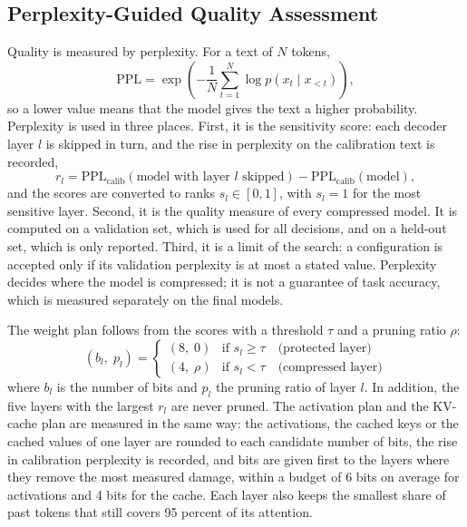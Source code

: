 \documentclass[num-refs]{wiley-article}
\begin{document}
\subsection{Perplexity-Guided Quality Assessment}

Quality is measured by perplexity. For a text of $N$ tokens,
\begin{equation}
  \mathrm{PPL} = \exp\left( -\frac{1}{N} \sum_{t=1}^{N} \log p(x_t \mid x_{<t}) \right),
  \label{eq:ppl}
\end{equation}
so a lower value means that the model gives the text a higher probability. Perplexity is used in three places. First, it is the sensitivity score: each decoder layer $l$ is skipped in turn, and the rise in perplexity on the calibration text is recorded,
\begin{equation}
  r_l = \mathrm{PPL}_{\mathrm{calib}}(\text{model with layer } l \text{ skipped}) - \mathrm{PPL}_{\mathrm{calib}}(\text{model}),
  \label{eq:score}
\end{equation}
and the scores are converted to ranks $s_l \in [0, 1]$, with $s_l = 1$ for the most sensitive layer. Second, it is the quality measure of every compressed model. It is computed on a validation set, which is used for all decisions, and on a held-out set, which is only reported. Third, it is a limit of the search: a configuration is accepted only if its validation perplexity is at most a stated value. Perplexity decides where the model is compressed; it is not a guarantee of task accuracy, which is measured separately on the final models.

The weight plan follows from the scores with a threshold $\tau$ and a pruning ratio $\rho$:
\begin{equation}
  (b_l,\; p_l) = \left\{
  \begin{array}{ll}
    (8,\; 0) & \text{if } s_l \geq \tau \quad \text{(protected layer)} \\
    (4,\; \rho) & \text{if } s_l < \tau \quad \text{(compressed layer)}
  \end{array}
  \right.
  \label{eq:plan}
\end{equation}
where $b_l$ is the number of bits and $p_l$ the pruning ratio of layer $l$. In addition, the five layers with the largest $r_l$ are never pruned. The activation plan and the KV-cache plan are measured in the same way: the activations, the cached keys or the cached values of one layer are rounded to each candidate number of bits, the rise in calibration perplexity is recorded, and bits are given first to the layers where they remove the most measured damage, within a budget of 6 bits on average for activations and 4 bits for the cache. Each layer also keeps the smallest share of past tokens that still covers 95 percent of its attention.
\end{document}

